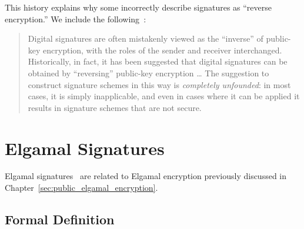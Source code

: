 This history explains why some incorrectly describe \glspl{signature}
as ``reverse encryption.''
We include the
following~\cite[Chapter 13.1, Relation to Public-Key Encryption;
footnote omitted, emphasis original]{IntroModernCrypto}:

\begin{quote}
Digital signatures are often mistakenly viewed as the ``inverse''
of public-key encryption, with the roles of the sender and receiver
interchanged.
Historically, in fact, it has been suggested that digital signatures
can be obtained by ``reversing'' public-key encryption \dots
The suggestion to construct signature schemes in this way is
\emph{completely unfounded}:
in most cases, it is simply inapplicable,
and even in cases where it can be applied it results in signature schemes
that are not secure.
\end{quote}



\section{Elgamal Signatures}
\label{sec:signatures_elgamal}

Elgamal signatures~\cite{elgamal1985public} are related to
Elgamal encryption previously discussed
in Chapter~\ref{sec:public_elgamal_encryption}.

\subsection{Formal Definition}

